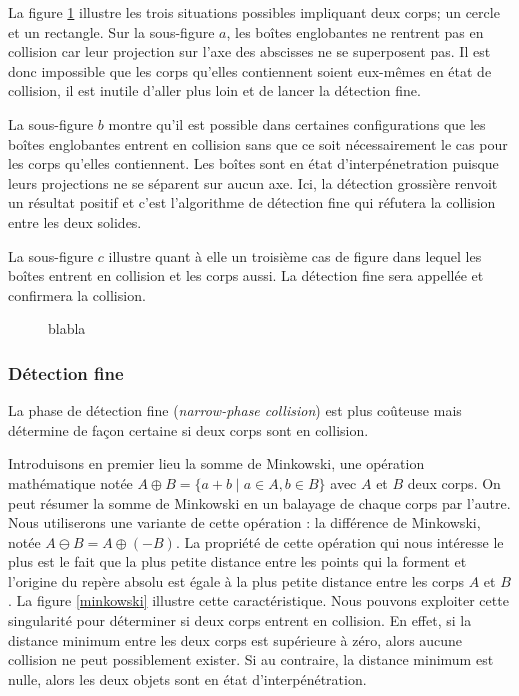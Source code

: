 La figure \ref{aabb} illustre les trois situations possibles
impliquant deux corps; un cercle et un rectangle. Sur la sous-figure
$a$, les boîtes englobantes ne rentrent pas en collision car leur
projection sur l'axe des abscisses ne se superposent pas. Il est donc
impossible que les corps qu'elles contiennent soient eux-mêmes en état
de collision, il est inutile d'aller plus loin et de lancer la
détection fine.

La sous-figure $b$ montre qu'il est possible dans certaines
configurations que les boîtes englobantes entrent en collision sans
que ce soit nécessairement le cas pour les corps qu'elles
contiennent. Les boîtes sont en état d'interpénetration puisque leurs
projections ne se séparent sur aucun axe. Ici, la détection grossière
renvoit un résultat positif et c'est l'algorithme de détection fine
qui réfutera la collision entre les deux solides.

La sous-figure $c$ illustre quant à elle un troisième cas de figure
dans lequel les boîtes entrent en collision et les corps aussi. La
détection fine sera appellée et confirmera la collision.

\begin{figure}
  \centering
  \subfloat[]{  }
  \qquad
  \subfloat[]{  }
  \qquad
  \subfloat[]{  }
  \caption{blabla}
  \label{aabb}
\end{figure}

\subsubsection{Détection fine}

La phase de détection fine (\textit{narrow-phase collision}) est plus
coûteuse mais détermine de façon certaine si deux corps sont en
collision.

Introduisons en premier lieu la somme de Minkowski, une opération
mathématique notée $A \oplus B = \{a + b \mid a \in A, b \in B\}$ avec
$A$ et $B$ deux corps. On peut résumer la somme de Minkowski en un
balayage de chaque corps par l'autre. Nous utiliserons une variante de
cette opération : la différence de Minkowski, notée $A \ominus B = A
\oplus (-B)$. La propriété de cette opération qui nous intéresse le
plus est le fait que la plus petite distance entre les points qui la
forment et l'origine du repère absolu est égale à la plus petite
distance entre les corps $A$ et $B$. La figure \ref{minkowski}
illustre cette caractéristique. Nous pouvons exploiter cette
singularité pour déterminer si deux corps entrent en collision. En
effet, si la distance minimum entre les deux corps est supérieure à
zéro, alors aucune collision ne peut possiblement exister. Si au
contraire, la distance minimum est nulle, alors les deux objets sont
en état d'interpénétration.

